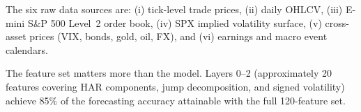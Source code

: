 The six raw data sources are: (i) tick-level trade prices, (ii) daily OHLCV, (iii) E-mini S\&P 500 Level~2 order book, (iv) SPX implied volatility surface, (v) cross-asset prices (VIX, bonds, gold, oil, FX), and (vi) earnings and macro event calendars.

\begin{keyidea}
The feature set matters more than the model.
Layers 0--2 (approximately 20 features covering HAR components, jump decomposition, and signed volatility) achieve 85\% of the forecasting accuracy attainable with the full 120-feature set.
\end{keyidea}
